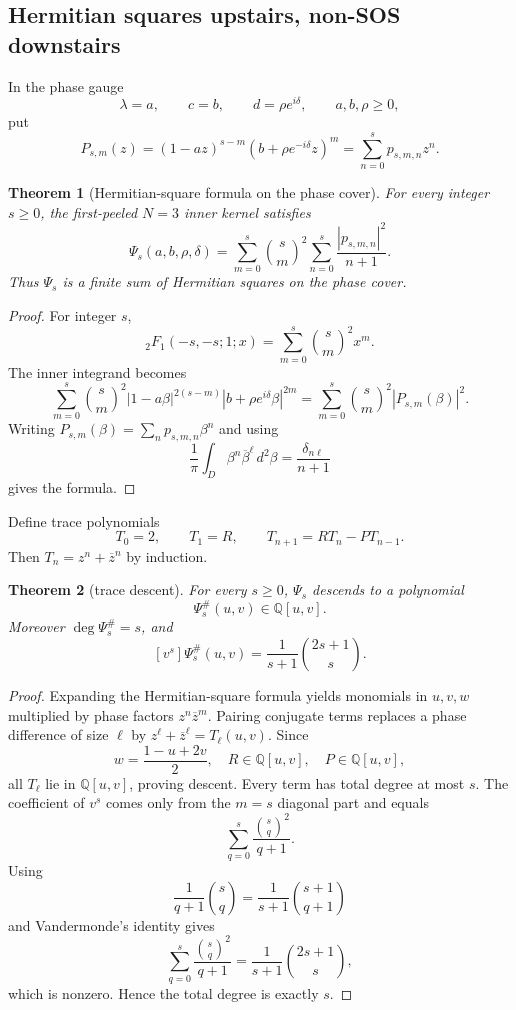\documentclass[11pt]{article}
\newtheorem{theorem}{Theorem}[section]
\newcommand{\Q}{\mathbb Q}
\begin{document}
\subsection{Hermitian squares upstairs, non-SOS downstairs}

In the phase gauge
\[
\lambda=a,
\qquad
c=b,
\qquad
d=\rho e^{i\delta},
\qquad a,b,\rho\ge0,
\]
put
\[
P_{s,m}(z)=(1-az)^{s-m}(b+\rho e^{-i\delta}z)^m
=\sum_{n=0}^s p_{s,m,n}z^n.
\]

\begin{theorem}[Hermitian-square formula on the phase cover]
For every integer $s\ge0$, the first-peeled $N=3$ inner kernel satisfies
\[
\Psi_s(a,b,\rho,\delta)=\sum_{m=0}^s\binom sm^2\sum_{n=0}^s
\frac{|p_{s,m,n}|^2}{n+1}.
\]
Thus $\Psi_s$ is a finite sum of Hermitian squares on the phase cover.
\end{theorem}

\begin{proof}
For integer $s$,
\[
{}_2F_1(-s,-s;1;x)=\sum_{m=0}^s\binom sm^2x^m.
\]
The inner integrand becomes
\[
\sum_{m=0}^s\binom sm^2|1-a\beta|^{2(s-m)}|b+\rho e^{i\delta}\beta|^{2m}
=\sum_{m=0}^s\binom sm^2|P_{s,m}(\beta)|^2.
\]
Writing $P_{s,m}(\beta)=\sum_np_{s,m,n}\beta^n$ and using
\[
\frac1\pi\int_D \beta^n\overline{\beta}^{\ell}\,d^2\beta=\frac{\delta_{n\ell}}{n+1}
\]
gives the formula.
\end{proof}

Define trace polynomials
\[
T_0=2,
\qquad
T_1=R,
\qquad
T_{n+1}=RT_n-PT_{n-1}.
\]
Then $T_n=z^n+\overline z^n$ by induction.

\begin{theorem}[trace descent]
For every $s\ge0$, $\Psi_s$ descends to a polynomial
\[
\Psi_s^\#(u,v)\in\Q[u,v].
\]
Moreover $\deg\Psi_s^\#=s$, and
\[
[v^s]\Psi_s^\#(u,v)=\frac1{s+1}\binom{2s+1}{s}.
\]
\end{theorem}

\begin{proof}
Expanding the Hermitian-square formula yields monomials in $u,v,w$ multiplied by
phase factors $z^n\overline z^{m}$.  Pairing conjugate terms replaces a phase difference
of size $\ell$ by $z^\ell+\overline z^\ell=T_\ell(u,v)$.  Since
\[
w=\frac{1-u+2v}{2},\quad R\in\Q[u,v],\quad P\in\Q[u,v],
\]
all $T_\ell$ lie in $\Q[u,v]$, proving descent.
Every term has total degree at most $s$.  The coefficient of $v^s$ comes only from the
$m=s$ diagonal part and equals
\[
\sum_{q=0}^s\frac{\binom sq^2}{q+1}.
\]
Using
\[
\frac1{q+1}\binom sq=\frac1{s+1}\binom{s+1}{q+1}
\]
and Vandermonde's identity gives
\[
\sum_{q=0}^s\frac{\binom sq^2}{q+1}
=\frac1{s+1}\binom{2s+1}{s},
\]
which is nonzero.  Hence the total degree is exactly $s$.
\end{proof}
\end{document}

